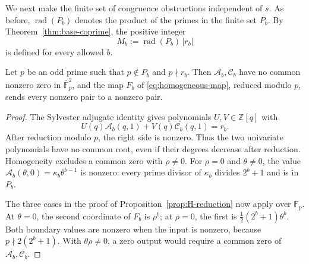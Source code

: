\documentclass[12pt]{article}
\newcommand{\Z}{\mathbb{Z}}
\newcommand{\F}{\mathbb{F}}
\newcommand{\rad}{\operatorname{rad}}
\begin{document}
We next make the finite set of congruence obstructions independent of $s$.
As before, $\rad(P_b)$ denotes the product of the primes in the finite set $P_b$.
By Theorem~\ref{thm:base-coprime}, the positive integer
\begin{equation}\label{eq:uniform-modulus}
M_b:=\rad(P_b)\,|r_b|
\end{equation}
is defined for every allowed $b$.

\begin{lemma}\label{lem:local-avoidance}
Let $p$ be an odd prime such that $p\notin P_b$ and $p\nmid r_b$.
Then $\mathcal A_b,\mathcal C_b$ have no common nonzero zero in
$\overline{\F}_p^2$, and the map $F_b$ of \eqref{eq:homogeneous-map}, reduced
modulo $p$, sends every nonzero pair to a nonzero pair.
\end{lemma}
\begin{proof}
The Sylvester adjugate identity gives polynomials $U,V\in\Z[q]$ with
\[
U(q)\mathcal A_b(q,1)+V(q)\mathcal C_b(q,1)=r_b.
\]
After reduction modulo $p$, the right side is nonzero. Thus the two univariate
polynomials have no common root, even if their degrees decrease after reduction.
Homogeneity excludes a common zero with $\rho\ne0$.
For $\rho=0$ and $\theta\ne0$, the value
$\mathcal A_b(\theta,0)=\kappa_b\theta^{b-1}$ is nonzero: every prime divisor
of $\kappa_b$ divides $2^b+1$ and is in $P_b$.

The three cases in the proof of Proposition~\ref{prop:H-reduction} now apply
over $\overline{\F}_p$. At $\theta=0$, the second coordinate of $F_b$ is
$\rho^b$; at $\rho=0$, the first is $\tfrac12(2^b+1)\theta^b$.
Both boundary values are nonzero when the input is nonzero, because
$p\nmid2(2^b+1)$. With $\theta\rho\ne0$, a zero output would require a common
zero of $\mathcal A_b,\mathcal C_b$.
\end{proof}
\end{document}
